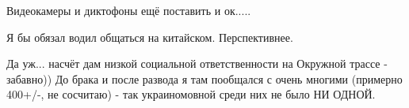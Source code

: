 \begin{itemize}
 
Видеокамеры и диктофоны ещё поставить и ок.....

 
Я бы обязал водил общаться на китайском. Перспективнее.

 

Да уж... насчёт дам низкой социальной ответственности на Окружной трассе -
забавно)) До брака и после развода я там пообщался с очень многими (примерно
400+/-, не сосчитаю) - так украиномовной среди них не было НИ ОДНОЙ.
\end{itemize}

